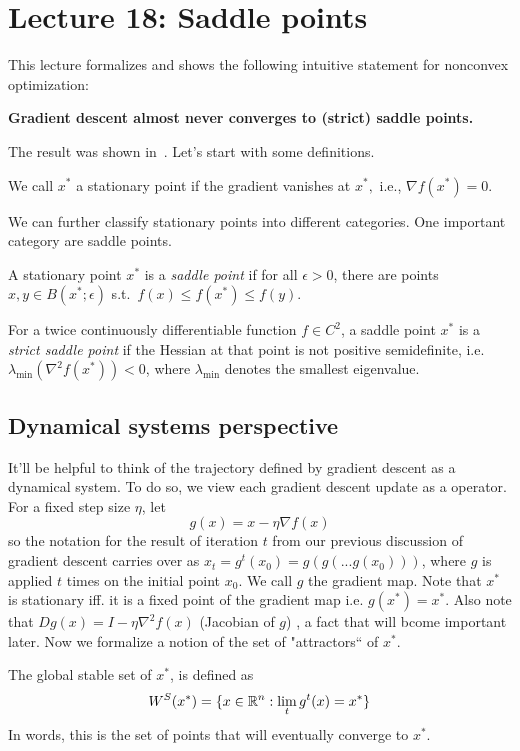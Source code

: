 \section{Lecture 18: Saddle points} 

This lecture formalizes and shows the following intuitive statement for
nonconvex optimization:
\begin{center}
	\textbf{Gradient descent almost never converges to (strict) saddle points.}
\end{center}
The result was shown in~\cite{lee2016gradient}. Let's start with some definitions.

\begin{definition}
We call $x^*$ a stationary point if the gradient vanishes at $x^*,$ i.e., 
$\nabla f(x^*) = 0$. 
\end{definition}

We can further classify stationary points into different categories. One
important category are saddle points.

\begin{definition}
A stationary point $x^*$ is a \emph{saddle point} 
if for all $\epsilon>0$,  there are points $x,y \in B(x^*;\epsilon)$ 
s.t.~$f(x)\leq f(x^*)\leq f(y)$.
\end{definition}

\begin{definition}
For a twice continuously differentiable function $f\in C^2$, a saddle point
$x^*$ is a \emph{strict saddle point} if the Hessian at that point is not
positive semidefinite, i.e.  $\lambda_{\text{min}}(\nabla^2 f(x^*)) < 0$, where
$\lambda_{\text{min}}$ denotes the smallest eigenvalue.
\end{definition}

\subsection{Dynamical systems perspective}

It'll be helpful to think of the trajectory defined by gradient descent as a
dynamical system.
To do so, we view each gradient descent update as a operator.  
For a fixed step size $\eta$, let
$$
g(x) = x-\eta\nabla f(x)
$$ 
so the notation for the result of iteration $t$ from our previous discussion of gradient descent carries over as $x_t = g^t(x_0) = g(g(...g(x_0)))$, where $g$ is applied $t$ times on the initial point $x_0$. We call $g$ the gradient map. Note that $x^*$ is stationary iff. it is a fixed point of the gradient map i.e. $g(x^*) = x^*$. Also note that
$D g(x) = I - \eta\nabla^2 f(x)$ (Jacobian of $g$) , a fact that will bcome important later. Now we formalize a notion of the set of "attractors`` of $x^*$.
\begin{definition}
The global stable set of $x^*$, is defined as
$$
W^S(x^*) = \{ x\in\mathbb{R}^n: \lim_{t} g^t(x) = x^* \}
$$
In words, this is the set of points that will eventually converge to $x^*$.
\end{definition}

